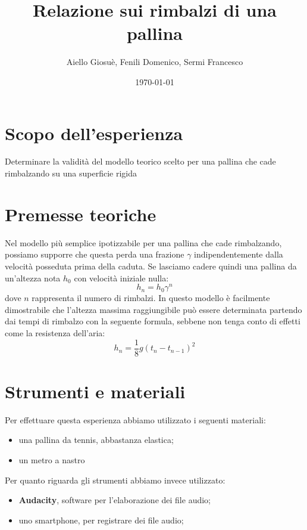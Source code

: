 \documentclass{article}
\title{Relazione sui rimbalzi di una pallina}
\author{Aiello Giosuè, Fenili Domenico, Sermi Francesco}
\date{\today}
\begin{document}
\maketitle
\pagebreak
\tableofcontents
\pagebreak
\section{Scopo dell'esperienza}
Determinare la validità del modello teorico scelto per una pallina che cade rimbalzando su una superficie rigida
\section{Premesse teoriche}
Nel modello più semplice ipotizzabile per una pallina che cade rimbalzando, possiamo supporre che questa perda una frazione $\gamma$ indipendentemente dalla velocità posseduta prima della caduta. Se lasciamo cadere quindi una pallina da un'altezza nota $h_0$ con velocità iniziale nulla:
\begin{equation}
	h_n = h_0 \gamma ^n
\end{equation}
dove $n$ rappresenta il numero di rimbalzi. In questo modello è facilmente dimostrabile che l'altezza massima raggiungibile può essere determinata partendo dai tempi di rimbalzo con la seguente formula, sebbene non tenga conto di effetti come la resistenza dell'aria:
\begin{equation}
	h_n = \frac{1}{8} g (t_n - t_{n-1})^2
\end{equation}
\section{Strumenti e materiali}
Per effettuare questa esperienza abbiamo utilizzato i seguenti materiali:
\begin{itemize}
	\item una pallina da tennis, abbastanza elastica;
	\item un metro a nastro
\end{itemize}
Per quanto riguarda gli strumenti abbiamo invece utilizzato:
\begin{itemize}
	\item \textbf{Audacity}, software per l'elaborazione dei file audio;
	\item uno smartphone, per registrare dei file audio;
\end{itemize}
\end{document}
